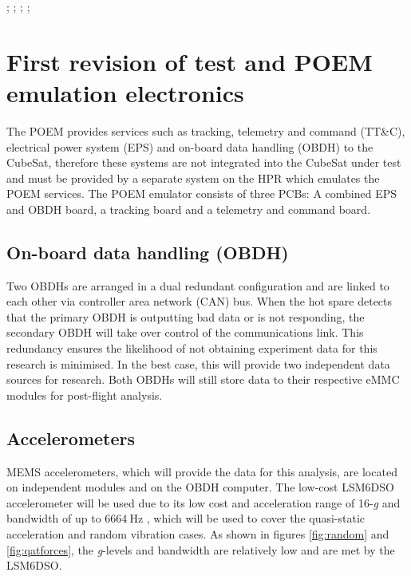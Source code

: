 \documentclass[a4paper,11pt]{article}
\begin{document}
;
;
;
;
\section{First revision of test and POEM emulation electronics}

The POEM provides services such as tracking, telemetry and command (TT\&C), electrical power system (EPS) and on-board data handling (OBDH) to the CubeSat, therefore these systems are not integrated into the CubeSat under test and must be provided by a separate system on the HPR which emulates the POEM services. The POEM emulator consists of three PCBs: A combined EPS and OBDH board, a tracking board and a telemetry and command board.

\subsection{On-board data handling (OBDH)}
Two OBDHs are arranged in a dual redundant configuration and are linked to each other via controller area network (CAN) bus. When the hot spare detects that the primary OBDH is outputting bad data or is not responding, the secondary OBDH will take over control of the communications link. This redundancy ensures the likelihood of not obtaining experiment data for this research is minimised. In the best case, this will provide two independent data sources for research. Both OBDHs will still store data to their respective eMMC modules for post-flight analysis.

\subsection{Accelerometers}
MEMS accelerometers, which will provide the data for this analysis, are located on independent modules and on the OBDH computer. The low-cost LSM6DSO accelerometer will be used due to its low cost and acceleration range of 16-\textit{g} and bandwidth of up to $\SI{6664}{\hertz}$ \cite{lsm6dso-datasheet}, which will be used to cover the quasi-static acceleration and random vibration cases. As shown in figures \ref{fig:random} and \ref{fig:qatforces}, the \textit{g}-levels and bandwidth are relatively low and are met by the LSM6DSO.
\end{document}
